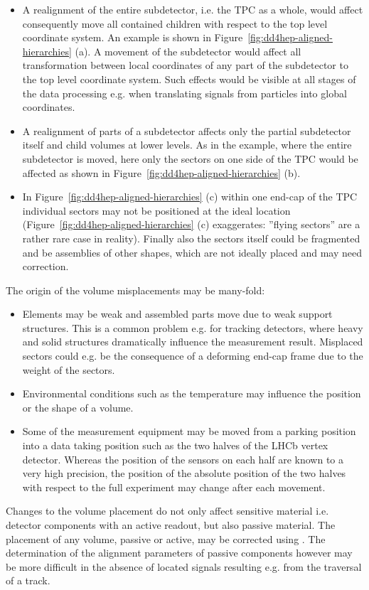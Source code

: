 \documentclass[10pt,a4paper]{article}
\begin{document}
\noindent
\begin{itemize}\itemcompact
\item A realignment of the entire subdetector, i.e. the TPC as a whole, 
    would affect consequently move all contained children with respect to the 
    top level coordinate system. An example is shown in 
    Figure~\ref{fig:dd4hep-aligned-hierarchies} (a). A movement of the subdetector
    would affect all transformation between local coordinates of any part of the
    subdetector to the top level coordinate system. Such effects would be visible 
    at all stages of the data processing e.g. when translating signals from 
    particles into global coordinates.
\item A realignment of parts of a subdetector affects only the partial subdetector
    itself and child volumes at lower levels. As in the example, where the entire
    subdetector is moved, here only the sectors on one side of the TPC would be affected
    as shown in Figure~\ref{fig:dd4hep-aligned-hierarchies} (b).
\item In Figure~\ref{fig:dd4hep-aligned-hierarchies} (c) within one end-cap of the TPC
    individual sectors may not be positioned at the ideal location
    (Figure~\ref{fig:dd4hep-aligned-hierarchies} (c) exaggerates: 
    ''flying sectors'' are a rather rare case in reality).
    Finally also the sectors itself could be fragmented and be assemblies of other
    shapes, which are not ideally placed and may need correction.
\end{itemize}
The origin of the volume misplacements may be many-fold:
\begin{itemize}\itemcompact
\item Elements may be weak and assembled parts move due to weak support structures.
    This is a common problem e.g. for tracking detectors, where heavy and solid 
    structures dramatically influence the measurement result.
    Misplaced sectors could e.g. be the consequence of a deforming end-cap frame due 
    to the weight of the sectors.
\item Environmental conditions such as the temperature may influence the 
    position or the shape of a volume.
\item Some of the measurement equipment may be moved from a parking position into 
    a data taking position such as the two halves of the LHCb vertex detector. 
    Whereas the position of the sensors on each half are known to a very high 
    precision, the position of the absolute position of the two halves with respect
    to the full experiment may change after each movement.
\end{itemize}
Changes to the volume placement do not only affect sensitive material i.e. detector
components with an active readout, but also passive material. The placement 
of any volume, passive or active, may be corrected using \DDA. The determination
of the alignment parameters of passive components however may be more difficult 
in the absence of located signals resulting e.g. from the traversal of a track.
\end{document}
